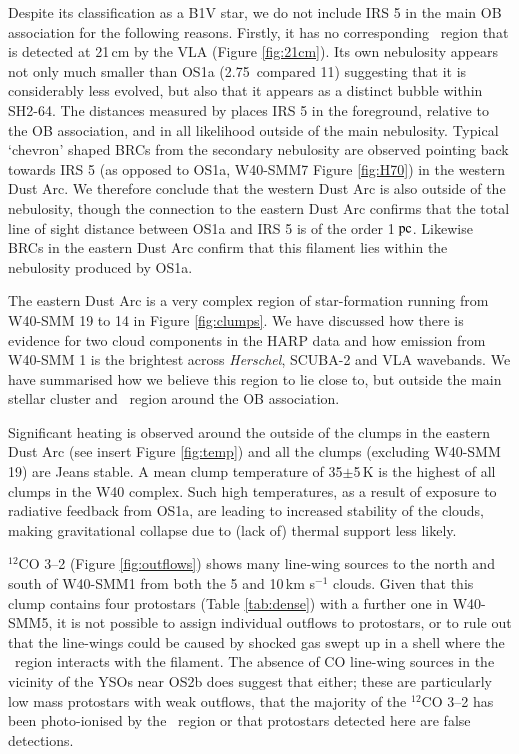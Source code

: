 Despite its classification as a B1V star, we do not include IRS 5 in the main OB association 
for the following reasons. Firstly, it has no corresponding \HII\ region that is detected at 
21\,cm by the VLA (Figure \ref{fig:21cm}). Its own nebulosity appears not only much smaller 
than OS1a (2.75\arcmin\ compared 11\arcmin) suggesting that it is considerably less 
evolved, but also that it appears as a distinct bubble within SH2-64. The distances 
measured by \cite{Shuping:2012ly} places IRS 5 in the foreground, relative to the OB 
association, and in all likelihood outside of the main nebulosity. Typical `chevron' shaped 
BRCs from the secondary nebulosity are observed pointing back towards IRS 5 (as 
opposed to OS1a, W40-SMM7 Figure \ref{fig:H70}) in the western Dust Arc. We therefore 
conclude that the western Dust Arc is also outside of the nebulosity, though the connection 
to the eastern Dust Arc confirms that the total line of sight distance between OS1a and 
IRS 5 is of the order 1$\hbox{ pc}$. Likewise BRCs in the eastern Dust Arc confirm that 
this filament lies within the nebulosity produced by OS1a.

The eastern Dust Arc is a very complex region of star-formation running from W40-SMM 19 to 14 
in Figure \ref{fig:clumps}. We have discussed how there is evidence for two cloud components in 
the HARP data and how emission from W40-SMM 1 is the brightest across \emph{Herschel}, SCUBA-2 
and VLA wavebands. We have summarised how we believe this region to lie close to, but outside 
the main stellar cluster and \HII\ region around the OB association.

Significant heating is observed around the outside of the clumps in the eastern Dust Arc (see 
insert Figure \ref{fig:temp}) and all the clumps (excluding W40-SMM 19) are Jeans stable. A 
mean clump temperature of 35$\pm$5\,K is the highest of all clumps in the W40 complex. Such 
high temperatures, as a result of exposure to radiative feedback from OS1a, are leading to 
increased stability of the clouds, making gravitational collapse due to (lack of) thermal support 
less likely. 

$^{12}$CO 3\hbox{--}2  (Figure \ref{fig:outflows}) shows many line-wing sources to the north 
and south of W40-SMM1 from both the 5 and 10\,km s$^{-1}$ clouds. Given that this clump 
contains four protostars (Table \ref{tab:dense}) with a further one in W40-SMM5, it is not possible 
to assign individual outflows to protostars, or to rule out that the line-wings could be caused by 
shocked gas swept up in a shell where the \HII\ region interacts with the filament. The absence 
of CO line-wing sources in the vicinity of the YSOs near OS2b does suggest that either; these 
are particularly low mass protostars with weak outflows, that the majority of the $^{12}$CO 
3\hbox{--}2 has been photo-ionised by the \HII\ region or that protostars detected here are 
false detections. 

